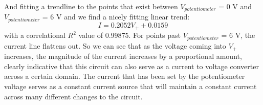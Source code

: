 \documentclass{article}
\begin{document}
    And fitting a trendline to the points that exist between $V_{potentiometer}$ = 0 V and $V_{potentiometer}$ = 6 V and we find a nicely fitting linear trend:
    \begin{equation}
        I = 0.2052V_+ + 0.0159
    \end{equation}
    with a correlational $R^{2}$ value of 0.99875. For points past $V_{potentiometer}$ = 6 V, the current line flattens out. So we can see that as the voltage coming into $V_+$ increases, the magnitude of the current increases by a proportional amount, clearly indicative that this circuit can also serve as a current to voltage converter across a certain domain. The current that has been set by the potentiometer voltage serves as a constant current source that will maintain a constant current across many different changes to the circuit.
    
    
\end{document}
